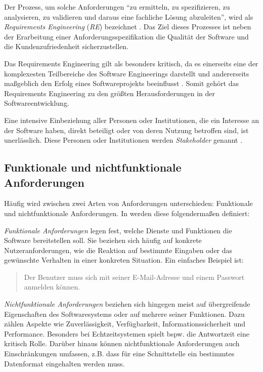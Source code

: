 \documentclass[acmtog]{acmart}
\begin{document}
Der Prozess, um solche Anforderungen ``zu ermitteln, zu spezifizieren, zu analysieren, zu validieren und daraus eine fachliche Lösung abzuleiten'', wird als \emph{Requirements Engineering} (\emph{RE}) bezeichnet \cite{balzert09}.
Das Ziel dieses Prozesses ist neben der Erarbeitung einer Anforderungsspezifikation die Qualität der Software und die Kundenzufriedenheit sicherzustellen.

Das Requirements Engineering gilt als besonders kritisch, da es einerseits eine der komplexesten Teilbereiche des Software Engineerings darstellt und andererseits maßgeblich den Erfolg eines Softwareprojekts beeinflusst \cite{balzert09}.
Somit gehört das Requirements Engineering zu den größten Herausforderungen in der Softwareentwicklung.

Eine intensive Einbeziehung aller Personen oder Institutionen, die ein Interesse an der Software haben, direkt beteiligt oder von deren Nutzung betroffen sind, ist unerlässlich. Diese Personen oder Institutionen werden \emph{Stakeholder} genannt \cite{balzert09}.

\subsection{Funktionale und nichtfunktionale Anforderungen}
Häufig wird zwischen zwei Arten von Anforderungen unterschieden: Funktionale und nichtfunktionale Anforderungen. In \cite{sommerville16} werden diese folgendermaßen definiert:

\emph{Funktionale Anforderungen} legen fest, welche Dienste und Funktionen die Software bereitstellen soll. Sie beziehen sich häufig auf konkrete Nutzeranforderungen, wie die Reaktion auf bestimmte Eingaben oder das gewünschte Verhalten in einer konkreten Situation.
Ein einfaches Beispiel ist:
\begin{quote}
	Der Benutzer muss sich mit seiner E-Mail-Adresse und einem Passwort anmelden können.
\end{quote}

\emph{Nichtfunktionale Anforderungen} beziehen sich hingegen meist auf übergreifende Eigenschaften des Softwaresystems oder auf mehrere seiner Funktionen. Dazu zählen Aspekte wie Zuverlässigkeit, Verfügbarkeit, Informationssicherheit und Performance. Besonders bei Echtzeitsystemen spielt bspw. die Antwortzeit eine kritisch Rolle. Darüber hinaus können nichtfunktionale Anforderungen auch Einschränkungen umfassen, z.B. dass für eine Schnittstelle ein bestimmtes Datenformat eingehalten werden muss.
\end{document}

